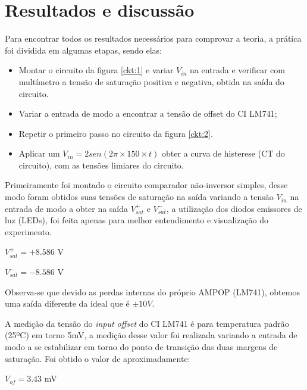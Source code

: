 \section{Resultados e discussão}

Para encontrar todos os resultados necessários para comprovar a teoria, a prática foi dividida em algumas etapas, sendo elas:


\begin{itemize}

    \item Montar o circuito da figura \ref{ckt:1} e variar $V_{in}$ na entrada e verificar com multímetro a tensão de saturação positiva e negativa, obtida na saída do circuito. 
    
    \item Variar a entrada de modo a encontrar a tensão de offset do CI LM741;
    
    \item Repetir o primeiro passo no circuito da figura \ref{ckt:2}.
    
    \item Aplicar um $V_{in} = 2sen (2\pi\times150\times t)$ obter a curva de histerese (CT do circuito), com as tensões limiares do circuito.
\end{itemize}

Primeiramente foi montado o circuito comparador não-inversor simples, desse modo foram obtidos suas tensões de saturação na saída variando a tensão $V_{in}$ na entrada de modo a obter na saída $V_{sat}^+$ e $V_{sat}^-$, a utilização dos diodos emissores de luz (LEDs), foi feita apenas para melhor entendimento e visualização do experimento. 

\begin{center}
        $V_{sat}^+ = +8.586$ V
\end{center}
\begin{center}
        $V_{sat}^- = -8.586$ V
\end{center}

Observa-se que devido as perdas internas do próprio AMPOP (LM741), obtemos uma saída diferente da ideal que é $\pm 10V$.

A medição da tensão do \textit{input offset} do CI LM741 é para temperatura padrão (25ºC) em torno 5mV, a medição desse valor foi realizada variando a entrada de modo a se estabilizar em torno do ponto de transição das duas margens de saturação. Foi obtido o valor de aproximadamente:

\begin{center}
        $V_{of} = 3.43$ mV
\end{center}

